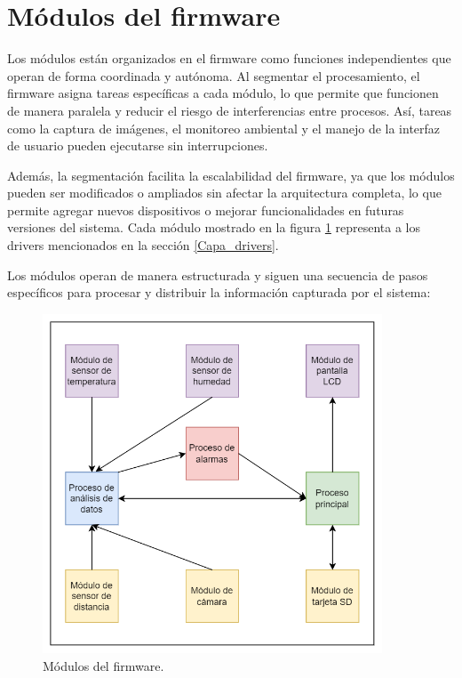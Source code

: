 \section{Módulos del firmware}

Los módulos están organizados en el firmware como funciones independientes que operan de forma coordinada y autónoma. Al segmentar el procesamiento, el firmware asigna tareas específicas a cada módulo, lo que permite que funcionen de manera paralela y reducir el riesgo de interferencias entre procesos. Así, tareas como la captura de imágenes, el monitoreo ambiental y el manejo de la interfaz de usuario pueden ejecutarse sin interrupciones.

Además, la segmentación facilita la escalabilidad del firmware, ya que los módulos pueden ser modificados o ampliados sin afectar la arquitectura completa, lo que permite agregar nuevos dispositivos o mejorar funcionalidades en futuras versiones del sistema. Cada módulo mostrado en la figura \ref{fig:modulos_del_firmware} representa a los drivers mencionados en la sección \ref{Capa_drivers}.

Los módulos operan de manera estructurada y siguen una secuencia de pasos específicos para procesar y distribuir la información capturada por el sistema:

\vspace{1cm}
\begin{figure}[htbp]
	\centering
	\includegraphics[width=0.9\textwidth, height=0.5\textheight]{./Figures/modulos_del_firmware.png}
	\caption{Módulos del firmware.}
	\label{fig:modulos_del_firmware}
\end{figure}
\vspace{1cm}

